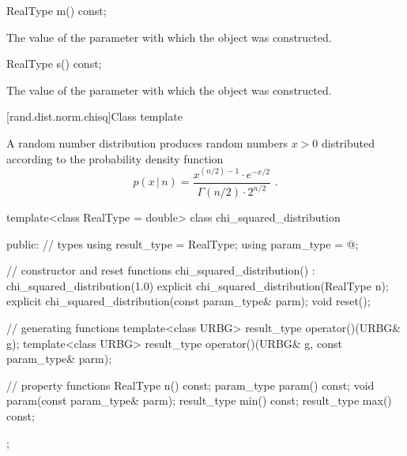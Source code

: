 %
\begin{itemdecl}
RealType m() const;
\end{itemdecl}

\begin{itemdescr}
\pnum
\returns
The value of the  parameter
 with which the object was constructed.
\end{itemdescr}

%
\begin{itemdecl}
RealType s() const;
\end{itemdecl}

\begin{itemdescr}
\pnum
\returns
The value of the  parameter
 with which the object was constructed.
\end{itemdescr}


[rand.dist.norm.chisq]{Class template }%
%
%

\pnum
A  random number distribution
produces random numbers $x > 0$
distributed according to
the probability density function%
%
%
\[ p(x\,|\,n) = \frac{x^{(n/2)-1} \cdot e^{-x/2}}{\Gamma(n/2) \cdot 2^{n/2}} \text{ .} \]

%
%
\begin{codeblock}
template<class RealType = double>
  class chi_squared_distribution {
  public:
    // types
    using result_type = RealType;
    using param_type  = @\unspec@;

    // constructor and reset functions
    chi_squared_distribution() : chi_squared_distribution(1.0) {}
    explicit chi_squared_distribution(RealType n);
    explicit chi_squared_distribution(const param_type& parm);
    void reset();

    // generating functions
    template<class URBG>
      result_type operator()(URBG& g);
    template<class URBG>
      result_type operator()(URBG& g, const param_type& parm);

    // property functions
    RealType n() const;
    param_type param() const;
    void param(const param_type& parm);
    result_type min() const;
    result_type max() const;
  };
\end{codeblock}


